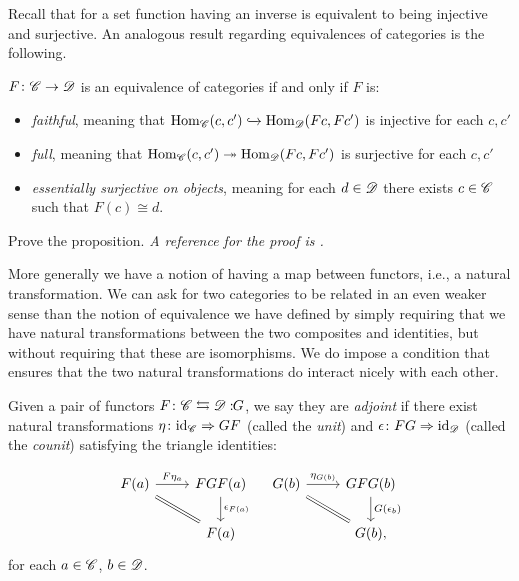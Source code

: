 \documentclass{article}[11pt]
\begin{document}
Recall that for a set function having an inverse is equivalent to being injective and surjective. An analogous result regarding equivalences of categories is the following.

\begin{proposition} $F\colon \mathscr{C} \to \mathscr{D}$ is an equivalence of categories if and only if $F$ is:
\vspace{-1em}
\begin{itemize}\itemsep0em
	\item \textit{faithful}, meaning that $\textup{Hom}_{\mathscr{C}}(c,c') \xhookrightarrow{} \textup{Hom}_{\mathscr{D}}(Fc, Fc')$ is injective for each $c,c'$
	\item \textit{full}, meaning that $\textup{Hom}_{\mathscr{C}}(c,c') \twoheadrightarrow \textup{Hom}_{\mathscr{D}}(Fc,Fc')$ is surjective for each $c,c'$
	\item \textit{essentially surjective on objects}, meaning for each $d\in \mathscr{D}$ there exists $c\in \mathscr{C}$ such that $F(c) \cong d$.
\end{itemize}
\end{proposition}

\begin{exercise}
Prove the proposition. \emph{A reference for the proof is \cite[Proposition 1]{WOMP}.}
\end{exercise}

More generally we have a notion of having a map between functors, i.e., a natural transformation. We can ask for two categories to be related in an even weaker sense than the notion of equivalence we have defined by simply requiring that we have natural transformations between the two composites and identities, but without requiring that these are isomorphisms. We do impose a condition that ensures that the two natural transformations do interact nicely with each other.

\begin{definition}\label{def1} Given a pair of functors $F\colon \mathscr{C} \leftrightarrows \mathscr{D}:\!\! G$, we say they are \textit{adjoint} if there exist natural transformations $\eta \colon \text{id}_{\mathscr{C}} \Rightarrow GF$ (called the \textit{unit}) and $\epsilon \colon FG \Rightarrow \text{id}_{\mathscr{D}}$ (called the \textit{counit}) satisfying the triangle identities:

\[
	\begin{tikzcd}
	F(a)\rar["F\eta_a" above]\ar[equal, dr] & FGF(a)\dar["\epsilon_{F(a)}" right] \\
	 & F(a)
	\end{tikzcd}\quad
	\begin{tikzcd}
	G(b)\rar["\eta_{G(b)}" above]\ar[equal, dr] & GFG(b)\dar["G(\epsilon_b)" right]\\
	& G(b),
	\end{tikzcd}
\]
for each $a\in \mathscr{C}$, $b\in \mathscr{D}$.

\end{definition}
\end{document}
